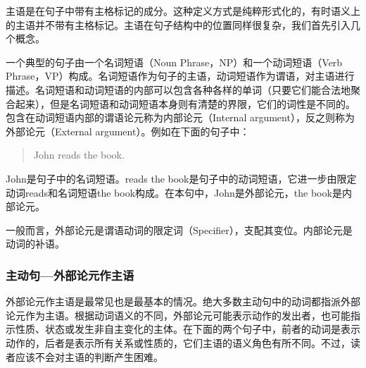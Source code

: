 主语是在句子中带有主格标记的成分。这种定义方式是纯粹形式化的，有时语义上的主语并不带有主格标记。主语在句子结构中的位置同样很复杂，我们首先引入几个概念。

一个典型的句子由一个名词短语（Noun Phrase，NP）和一个动词短语（Verb
Phrase，VP）构成。名词短语作为句子的主语，动词短语作为谓语，对主语进行描述。名词短语和动词短语的内部可以包含各种各样的单词（只要它们能合法地聚合起来），但是名词短语和动词短语本身则有清楚的界限，它们的词性是不同的。包含在动词短语内部的谓语论元称为内部论元（Internal
argument），反之则称为外部论元（External
argument）。例如在下面的句子中：

\begin{quote}
John reads the book.
\end{quote}

John是句子中的名词短语。reads the
book是句子中的动词短语，它进一步由限定动词reads和名词短语the
book构成。在本句中，John是外部论元，the book是内部论元。

一般而言，外部论元是谓语动词的限定词（Specifier），支配其变位。内部论元是动词的补语。

\subsubsection{主动句---外部论元作主语}\label{ux4e3bux52a8ux53e5ux5916ux90e8ux8bbaux5143ux4f5cux4e3bux8bed}

外部论元作主语是最常见也是最基本的情况。绝大多数主动句中的动词都指派外部论元作为主语。根据动词语义的不同，外部论元可能表示动作的发出者，也可能指示性质、状态或发生非自主变化的主体。在下面的两个句子中，前者的动词是表示动作的，后者是表示所有关系或性质的，它们主语的语义角色有所不同。不过，读者应该不会对主语的判断产生困难。

